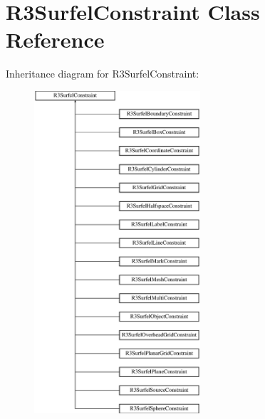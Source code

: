 \hypertarget{class_r3_surfel_constraint}{}\section{R3\+Surfel\+Constraint Class Reference}
\label{class_r3_surfel_constraint}
Inheritance diagram for R3\+Surfel\+Constraint\+:\begin{figure}[H]
\begin{center}
\leavevmode
\includegraphics[height=12.000000cm]{class_r3_surfel_constraint}
\end{center}
\end{figure}
